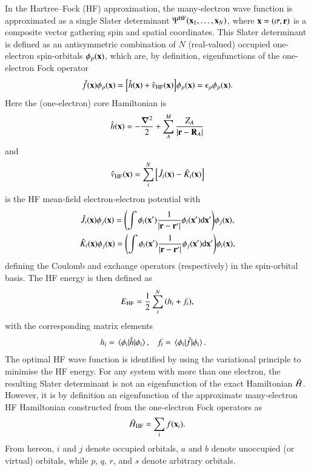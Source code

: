 \documentclass[aps,prb,reprint,noshowkeys,superscriptaddress]{revtex4-1}
\newcommand{\Ne}{N} %
\newcommand{\hH}{\Hat{H}}
\begin{document}
In the Hartree--Fock (HF) approximation, the many-electron wave function is approximated as a single Slater determinant $\Psi^{\text{HF}}(\vb{x}_1,\ldots,\vb{x}_N)$, where $\vb{x} = (\sigma,\vb{r})$ is a composite vector gathering spin and spatial coordinates.
This Slater determinant is defined as an antisymmetric combination of $\Ne$ (real-valued) occupied one-electron spin-orbitals $\phi_p(\vb{x})$, which are, by definition, eigenfunctions of the one-electron Fock operator 
\begin{equation}\label{eq:FockOp}
    \Hat{f}(\vb{x}) \phi_p(\vb{x}) = \qty[ \Hat{h}(\vb{x}) + \Hat{v}_\text{HF}(\vb{x}) ] \phi_p(\vb{x}) = \epsilon_p \phi_p(\vb{x}).
\end{equation}
Here the (one-electron) core Hamiltonian is
\begin{equation}
\label{eq:Hcore}
	\Hat{h}(\vb{x}) = -\frac{\grad^2}{2} + \sum_{A}^{M} \frac{Z_A}{\abs{\vb{r}-\vb{R}_A}}
\end{equation}
and
\begin{equation}
    \Hat{v}_\text{HF}(\vb{x}) = \sum_i^{N} \qty[ \Hat{J}_i(\vb{x}) - \Hat{K}_i(\vb{x}) ]
\end{equation}
is the HF mean-field electron-electron potential with 
\begin{subequations}
\begin{gather}
	\label{eq:CoulOp}
    \Hat{J}_i(\vb{x})\phi_j(\vb{x})=\qty(\int \phi_i(\vb{x}')\frac{1}{\abs{\vb{r} - \vb{r}'}}\phi_i(\vb{x}') \dd\vb{x}' ) \phi_j(\vb{x}),
	\\
	\label{eq:ExcOp}
\Hat{K}_i(\vb{x})\phi_j(\vb{x})=\qty(\int \phi_i(\vb{x}')\frac{1}{\abs{\vb{r} - \vb{r}'}}\phi_j(\vb{x}') \dd\vb{x}')\phi_i(\vb{x}),
\end{gather}
\end{subequations}
defining the Coulomb and exchange operators (respectively) in the spin-orbital basis.\cite{SzaboBook}
The HF energy is then defined as 
\begin{equation}
    \label{eq:E_HF}
    E_\text{HF} = \frac{1}{2} \sum_i^{N} \qty( h_i + f_i ),
\end{equation}
with the corresponding matrix elements
\begin{align}
	h_i & = \mel{\phi_i}{\Hat{h}}{\phi_i},
    & 
    f_i & = \mel{\phi_i}{\Hat{f}}{\phi_i}.
\end{align}
The optimal HF wave function is identified by using the variational principle to minimise the HF energy.
For any system with more than one electron, the resulting Slater determinant is not an eigenfunction of the exact Hamiltonian $\hH$. 
However, it is by definition an eigenfunction of the approximate many-electron HF Hamiltonian constructed 
from the one-electron Fock operators as
\begin{equation}\label{eq:HFHamiltonian}
	\hH_{\text{HF}} = \sum_{i} f(\vb{x}_i).
\end{equation}
From hereon, $i$ and $j$ denote occupied orbitals, $a$ and $b$ denote unoccupied (or virtual) orbitals, while $p$, $q$, $r$, and $s$ denote arbitrary orbitals.
\end{document}
